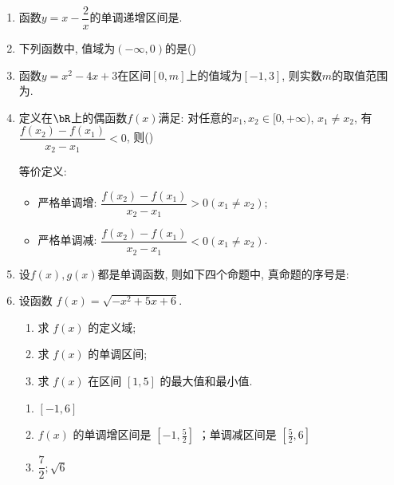 \begin{enumerate}
    \item 函数$y=x-\dfrac{2}{x}$的单调递增区间是. 

    \item 下列函数中, 值域为$(-\infty,0)$的是\dotfill()

    \item 函数$y=x^2-4x+3$在区间$[0,m]$上的值域为$[-1,3]$, 则实数$m$的取值范围为\blkda{$[2,4]$}. 

    \item 定义在$\bR$上的偶函数$f(x)$满足: 对任意的$x_1,x_2\in[0,+\infty)$, $x_1\neq x_2$, 有$\dfrac{f(x_2)-f(x_1)}{x_2-x_1}<0$, 则\dotfill()
    \begin{jieda}
    等价定义: 
    \begin{itemize}
    \item 严格单调增: $\dfrac{f(x_2)-f(x_1)}{x_2-x_1}>0(x_1\neq x_2)$; 
    \item 严格单调减: $\dfrac{f(x_2)-f(x_1)}{x_2-x_1}<0(x_1\neq x_2)$. 
    \end{itemize}
    \end{jieda}
    
    \item 设$f(x), g(x)$都是单调函数, 则如下四个命题中, 真命题的序号是: 

    \item 设函数 $f(x)=\sqrt{-x^2+5 x+6}$.
    \begin{enumerate}
        \item 求 $f(x)$ 的定义域;
        \item 求 $f(x)$ 的单调区间;
        \item 求 $f(x)$ 在区间 $[1,5]$ 的最大值和最小值.
    \end{enumerate}
    \begin{jieda}
    \begin{enumerate}
        \item $[-1,6]$
        \item $f(x)$ 的单调增区间是 $\left[-1, \frac{5}{2}\right]$ ；单调减区间是 $\left[\frac{5}{2}, 6\right]$
        \item $\dfrac{7}{2} ; \sqrt{6}$
    \end{enumerate}
    \end{jieda}
    

\end{enumerate}
